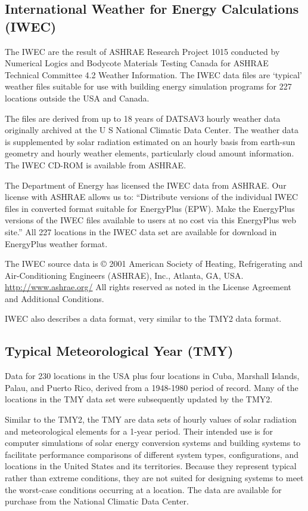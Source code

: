 \subsection{International Weather for Energy Calculations (IWEC)}\label{international-weather-for-energy-calculations-iwec}

The IWEC are the result of ASHRAE Research Project 1015 conducted by Numerical Logics and Bodycote Materials Testing Canada for ASHRAE Technical Committee 4.2 Weather Information. The IWEC data files are `typical' weather files suitable for use with building energy simulation programs for 227 locations outside the USA and Canada.

The files are derived from up to 18 years of DATSAV3 hourly weather data originally archived at the U S National Climatic Data Center. The weather data is supplemented by solar radiation estimated on an hourly basis from earth-sun geometry and hourly weather elements, particularly cloud amount information. The IWEC CD-ROM is available from ASHRAE.

The Department of Energy has licensed the IWEC data from ASHRAE. Our license with ASHRAE allows us to: ``Distribute versions of the individual IWEC files in converted format suitable for EnergyPlus (EPW). Make the EnergyPlus versions of the IWEC files available to users at no cost via this EnergyPlus web site.'' All 227 locations in the IWEC data set are available for download in EnergyPlus weather format.

The IWEC source data is © 2001 American Society of Heating, Refrigerating and Air-Conditioning Engineers (ASHRAE), Inc., Atlanta, GA, USA. \url{http://www.ashrae.org/} All rights reserved as noted in the License Agreement and Additional Conditions.

IWEC also describes a data format, very similar to the TMY2 data format.

\subsection{Typical Meteorological Year (TMY)}\label{typical-meteorological-year-tmy}

Data for 230 locations in the USA plus four locations in Cuba, Marshall Islands, Palau, and Puerto Rico, derived from a 1948-1980 period of record. Many of the locations in the TMY data set were subsequently updated by the TMY2.

Similar to the TMY2, the TMY are data sets of hourly values of solar radiation and meteorological elements for a 1-year period. Their intended use is for computer simulations of solar energy conversion systems and building systems to facilitate performance comparisons of different system types, configurations, and locations in the United States and its territories. Because they represent typical rather than extreme conditions, they are not suited for designing systems to meet the worst-case conditions occurring at a location. The data are available for purchase from the National Climatic Data Center.

